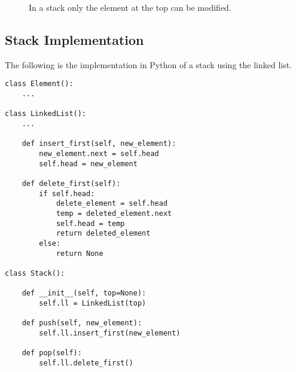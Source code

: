 \begin{figure}[H]
\centering
{}
\caption[In a stack only the element at the top can be modified.]{In a stack only the element at the top can be modified.}
\label{stack_1}
\end{figure}

\subsection{Stack Implementation}
The following is the implementation in Python of a stack using the linked list.
\begin{lstlisting}[firstnumber=1, caption={Stack implementation.}]
class Element():
	...

class LinkedList():
	...
	
	def insert_first(self, new_element):
		new_element.next = self.head
		self.head = new_element
	
	def delete_first(self):
		if self.head:
			delete_element = self.head
			temp = deleted_element.next
			self.head = temp
			return deleted_element
		else:
			return None

class Stack():
	
	def __init__(self, top=None):
		self.ll = LinkedList(top)
		
	def push(self, new_element):
		self.ll.insert_first(new_element)
	
	def pop(self):
		self.ll.delete_first()
\end{lstlisting}

